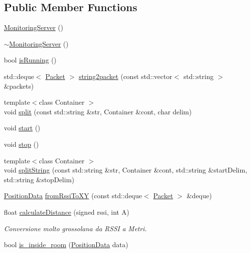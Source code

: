 \subsection*{Public Member Functions}
\begin{DoxyCompactItemize}
\item 
\hyperlink{class_monitoring_server_aa1162d5ef34903e51c1fe2134f1e3959}{Monitoring\+Server} ()
\item 
\hyperlink{class_monitoring_server_a746c8d1673afb88e6ea7149b20c766d4}{$\sim$\+Monitoring\+Server} ()
\item 
bool \hyperlink{class_monitoring_server_a8bc22df08a9db6280136cbd24bf907f1}{is\+Running} ()
\item 
std\+::deque$<$ \hyperlink{class_packet}{Packet} $>$ \hyperlink{class_monitoring_server_a184b7dece607f724cfa5cc05add554ce}{string2packet} (const std\+::vector$<$ std\+::string $>$ \&packets)
\item 
{\footnotesize template$<$class Container $>$ }\\void \hyperlink{class_monitoring_server_a1398ffaaddcc6859474083c353975581}{split} (const std\+::string \&str, Container \&cont, char delim)
\item 
void \hyperlink{class_monitoring_server_a00eefeea4d3a341babdb1d48d8b7cca5}{start} ()
\item 
void \hyperlink{class_monitoring_server_aa07082c64076b67ba802bfc2adec235b}{stop} ()
\item 
{\footnotesize template$<$class Container $>$ }\\void \hyperlink{class_monitoring_server_a1d242318daca890ae72cd675694a6411}{split\+String} (const std\+::string \&str, Container \&cont, std\+::string \&start\+Delim, std\+::string \&stop\+Delim)
\item 
\hyperlink{class_position_data}{Position\+Data} \hyperlink{class_monitoring_server_aa18eeed56d82fb3de1a4fe1ac1820b73}{from\+Rssi\+To\+XY} (const std\+::deque$<$ \hyperlink{class_packet}{Packet} $>$ \&deque)
\item 
float \hyperlink{class_monitoring_server_a34a8e8240fa207c0be29ba9bd2906d78}{calculate\+Distance} (signed rssi, int A)
\begin{DoxyCompactList}\small\item\em Conversione molto grossolana da R\+S\+SI a Metri. \end{DoxyCompactList}\item 
bool \hyperlink{class_monitoring_server_a5e3a184c4a5682cf798125aa9cec1fdf}{is\+\_\+inside\+\_\+room} (\hyperlink{class_position_data}{Position\+Data} data)

\end{DoxyCompactItemize}
